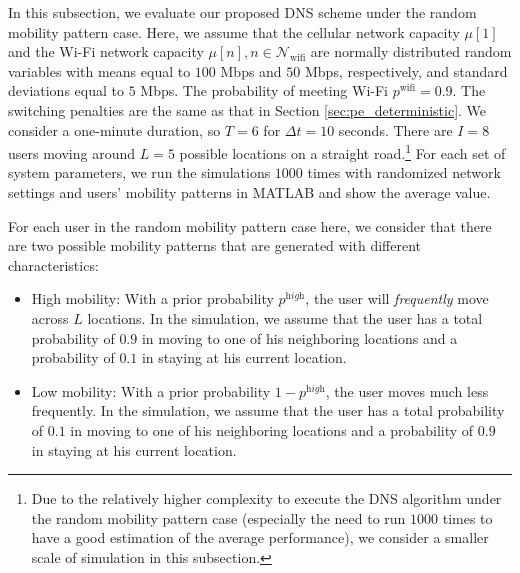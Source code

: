 \documentclass[journal]{IEEEtran}
\begin{document}
  In this subsection, we evaluate our proposed DNS scheme under the random mobility pattern case. 
	Here, we assume that the cellular network capacity $\mu[1]$ and the Wi-Fi network capacity $\mu[n], n \in \mathcal{N}_{\text{wifi}}$ are normally distributed random variables with means equal to $100$ Mbps and $50$ Mbps, respectively, and standard deviations equal to $5$ Mbps. 
	The probability of meeting Wi-Fi $p^{\text{wifi}} = 0.9$.
	The switching penalties are the same as that in Section \ref{sec:pe_deterministic}.
	We consider a one-minute duration, so $T = 6$ for $\Delta t = 10$ seconds.
	There are $I = 8$ users moving around $L = 5$ possible locations on a straight road.\footnote{Due to the relatively higher complexity to execute the DNS algorithm under the random mobility pattern case  (especially the need to run $1000$ times to have a good estimation of the average performance), we consider a smaller scale of simulation in this subsection.} %
  For each set of system parameters, we run the simulations $1000$ times with randomized network settings and users' mobility patterns in MATLAB and show the average value.



  For each user in the random mobility pattern case here, we consider that there are two possible mobility patterns that are generated with different characteristics: %

 
\begin{itemize}
	\item High mobility: With a prior probability $p^{\textit{high}}$, the user will \emph{frequently} move across $L$ locations. In the simulation, we assume that the user has a total probability of $0.9$ in moving to one of his neighboring locations and a probability of $0.1$ in staying at his current location.
	
	\item Low mobility: With a prior probability $1 - p^{\textit{high}}$, the user moves much less frequently. In the simulation, we assume that the user has a total probability of $0.1$ in moving to one of his neighboring locations and a probability of $0.9$ in staying at his current location.
\end{itemize}
\end{document}

